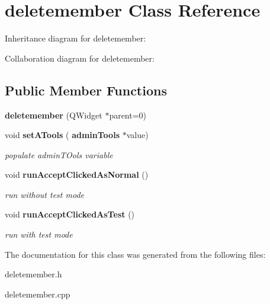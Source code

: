 \section{deletemember Class Reference}
\label{classdeletemember}


Inheritance diagram for deletemember\+:


Collaboration diagram for deletemember\+:
\subsection*{Public Member Functions}
\begin{DoxyCompactItemize}
\item 
\mbox{\label{classdeletemember_a6248fe50e61cfece7f8da3a504657dfd}} 
{\bfseries deletemember} (Q\+Widget $\ast$parent=0)
\item 
\mbox{\label{classdeletemember_a1737bd49bf99d4471f075153c17a4589}} 
void \textbf{ set\+A\+Tools} (\textbf{ admin\+Tools} $\ast$value)
\begin{DoxyCompactList}\small\item\em populate admin\+T\+Ools variable \end{DoxyCompactList}\item 
\mbox{\label{classdeletemember_a9cc806b990d568d2af87b1d538f05a23}} 
void \textbf{ run\+Accept\+Clicked\+As\+Normal} ()
\begin{DoxyCompactList}\small\item\em run without test mode \end{DoxyCompactList}\item 
\mbox{\label{classdeletemember_ae5ca17d621e098173957c0fe3ce3b6b1}} 
void \textbf{ run\+Accept\+Clicked\+As\+Test} ()
\begin{DoxyCompactList}\small\item\em run with test mode \end{DoxyCompactList}\end{DoxyCompactItemize}


The documentation for this class was generated from the following files\+:\begin{DoxyCompactItemize}
\item 
deletemember.\+h\item 
deletemember.\+cpp\end{DoxyCompactItemize}
